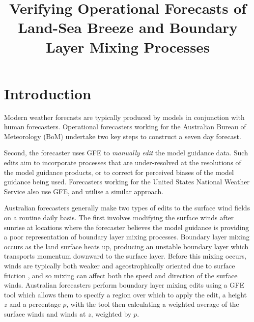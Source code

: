 \documentclass[twocol]{ametsoc}
\title{Verifying Operational Forecasts of Land-Sea Breeze and Boundary Layer Mixing Processes}
\affiliation{School of Earth Sciences, and ARC Centre of Excellence for Climate Extremes, The University of Melbourne, Melbourne, Victoria, Australia.}
\begin{document}
\maketitle

\section{Introduction}
\label{Sec:Introduction}
Modern weather forecasts are typically produced by models in conjunction with human forecasters. Operational forecasters working for the Australian Bureau of Meteorology (BoM) undertake two key steps to construct a seven day forecast. 


Second, the forecaster uses GFE to \textit{manually edit} the model guidance data. Such edits aim to incorporate processes that are under-resolved at the resolutions of the model guidance products, or to correct for perceived biases of the model guidance being used. Forecasters working for the United States National Weather Service also use GFE, and utilise a similar approach. 

Australian forecasters generally make two types of edits to the surface wind fields on a routine daily basis. The first involves modifying the surface winds after sunrise at locations where the forecaster believes the model guidance is providing a poor representation of boundary layer mixing processes. Boundary layer mixing occurs as the land surface heats up, producing an unstable boundary layer which transports momentum downward to the surface layer. Before this mixing occurs, winds are typically both weaker and ageostrophically oriented due to surface friction \citep{lee18}, and so mixing can affect both the speed and direction of the surface winds. Australian forecasters perform boundary layer mixing edits using a GFE tool which allows them to specify a region over which to apply the edit, a height $z$ and a percentage $p$, with the tool then calculating a weighted average of the surface winds and winds at $z$, weighted by $p$.
\end{document}
